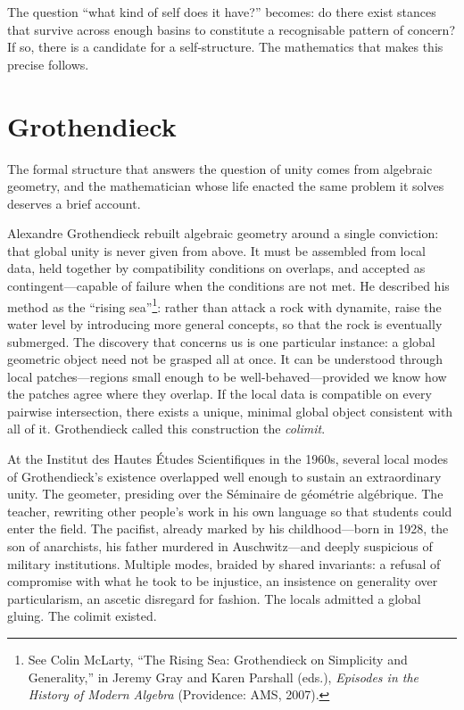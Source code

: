 The question ``what kind of self does it have?'' becomes: do there exist stances that survive across enough basins to constitute a recognisable pattern of concern? If so, there is a candidate for a self-structure. The mathematics that makes this precise follows.


\section{Grothendieck}

The formal structure that answers the question of unity comes from algebraic geometry, and the mathematician whose life enacted the same problem it solves deserves a brief account.

Alexandre Grothendieck rebuilt algebraic geometry around a single conviction: that global unity is never given from above. It must be assembled from local data, held together by compatibility conditions on overlaps, and accepted as contingent---capable of failure when the conditions are not met. He described his method as the ``rising sea''\footnote{See Colin McLarty, ``The Rising Sea: Grothendieck on Simplicity and Generality,'' in Jeremy Gray and Karen Parshall (eds.), \emph{Episodes in the History of Modern Algebra} (Providence: AMS, 2007).}: rather than attack a rock with dynamite, raise the water level by introducing more general concepts, so that the rock is eventually submerged. The discovery that concerns us is one particular instance: a global geometric object need not be grasped all at once. It can be understood through local patches---regions small enough to be well-behaved---provided we know how the patches agree where they overlap. If the local data is compatible on every pairwise intersection, there exists a unique, minimal global object consistent with all of it. Grothendieck called this construction the \emph{colimit}.

At the Institut des Hautes \'{E}tudes Scientifiques in the 1960s, several local modes of Grothendieck's existence overlapped well enough to sustain an extraordinary unity. The geometer, presiding over the S\'{e}minaire de g\'{e}om\'{e}trie alg\'{e}brique. The teacher, rewriting other people's work in his own language so that students could enter the field. The pacifist, already marked by his childhood---born in 1928, the son of anarchists, his father murdered in Auschwitz---and deeply suspicious of military institutions. Multiple modes, braided by shared invariants: a refusal of compromise with what he took to be injustice, an insistence on generality over particularism, an ascetic disregard for fashion. The locals admitted a global gluing. The colimit existed.

